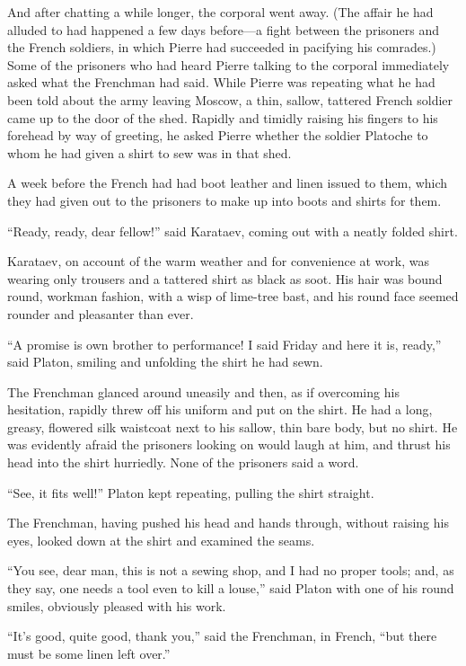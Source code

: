 And after chatting a while longer, the corporal went away. (The
affair he had alluded to had happened a few days before---a fight
between the prisoners and the French soldiers, in which Pierre
had succeeded in pacifying his comrades.) Some of the prisoners
who had heard Pierre talking to the corporal immediately asked
what the Frenchman had said.  While Pierre was repeating what he
had been told about the army leaving Moscow, a thin, sallow,
tattered French soldier came up to the door of the shed. Rapidly
and timidly raising his fingers to his forehead by way of
greeting, he asked Pierre whether the soldier Platoche to whom he
had given a shirt to sew was in that shed.

A week before the French had had boot leather and linen issued to
them, which they had given out to the prisoners to make up into
boots and shirts for them.

``Ready, ready, dear fellow!'' said Karataev, coming out with a
neatly folded shirt.

Karataev, on account of the warm weather and for convenience at
work, was wearing only trousers and a tattered shirt as black as
soot. His hair was bound round, workman fashion, with a wisp of
lime-tree bast, and his round face seemed rounder and pleasanter
than ever.

``A promise is own brother to performance! I said Friday and here
it is, ready,'' said Platon, smiling and unfolding the shirt he
had sewn.

The Frenchman glanced around uneasily and then, as if overcoming
his hesitation, rapidly threw off his uniform and put on the
shirt. He had a long, greasy, flowered silk waistcoat next to his
sallow, thin bare body, but no shirt. He was evidently afraid the
prisoners looking on would laugh at him, and thrust his head into
the shirt hurriedly. None of the prisoners said a word.

``See, it fits well!'' Platon kept repeating, pulling the shirt
straight.

The Frenchman, having pushed his head and hands through, without
raising his eyes, looked down at the shirt and examined the
seams.

``You see, dear man, this is not a sewing shop, and I had no
proper tools; and, as they say, one needs a tool even to kill a
louse,'' said Platon with one of his round smiles, obviously
pleased with his work.

``It's good, quite good, thank you,'' said the Frenchman, in
French, ``but there must be some linen left over.''

